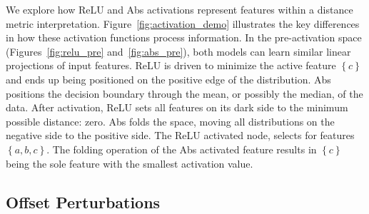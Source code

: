 We explore how ReLU and Abs activations represent features within a distance metric interpretation. Figure~\ref{fig:activation_demo} illustrates the key differences in how these activation functions process information. In the pre-activation space (Figures~\ref{fig:relu_pre} and~\ref{fig:abs_pre}), both models can learn similar linear projections of input features. ReLU is driven to minimize the active feature $\left\{ c \right\}$ and ends up being positioned on the positive edge of the distribution. Abs positions the decision boundary through the mean, or possibly the median, of the data. After activation, ReLU sets all features on its dark side to the minimum possible distance: zero. Abs folds the space, moving all distributions on the negative side to the positive side. The ReLU activated node, selects for features $\left\{ a, b, c \right\}$. The folding operation of the Abs activated feature results in $\left\{ c \right\}$ being the sole feature with the smallest activation value.

\subsection{Offset Perturbations}

